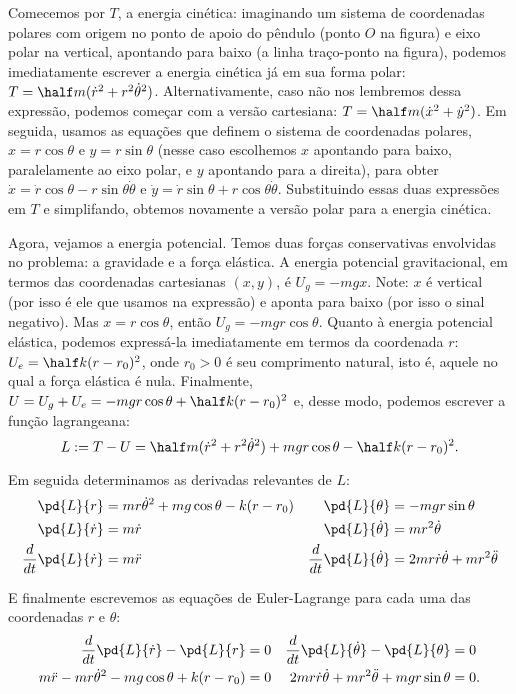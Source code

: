 \begin{question}
\begin{solution}
      Comecemos por $T$, a energia cinética: imaginando um sistema de coordenadas polares com origem no ponto de apoio do pêndulo (ponto $O$ na figura) e eixo polar na vertical, apontando para baixo (a linha traço-ponto na figura), podemos imediatamente escrever a energia cinética já em sua forma polar: $T = \half m (\dot r^2 + r^2 \dot \theta^2)$.
      Alternativamente, caso não nos lembremos dessa expressão, podemos começar com a versão cartesiana: $T = \half m (\dot x^2 + \dot y^2)$.
      Em seguida, usamos as equações que definem o sistema de coordenadas polares, $x = r \cos \theta$ e $y = r\sin \theta$ (nesse caso escolhemos $x$ apontando para baixo, paralelamente ao eixo polar, e $y$ apontando para a direita), para obter $\dot x = \dot r \cos \theta - r \sin \theta \dot \theta$ e $\dot y = \dot r \sin \theta + r \cos\theta \dot \theta$.
      Substituindo essas duas expressões em $T$ e simplifando, obtemos novamente a versão polar para a energia cinética.

      Agora, vejamos a energia potencial. Temos duas forças conservativas envolvidas no problema: a gravidade e a força elástica.
      A energia potencial gravitacional, em termos das coordenadas cartesianas $(x,y)$, é $U_g = -mgx$.
      Note: $x$ é vertical (por isso é ele que usamos na expressão) e aponta para baixo (por isso o sinal negativo).
      Mas $x = r\cos \theta$, então $U_g = -mgr\cos \theta$.
      Quanto à energia potencial elástica, podemos expressá-la imediatamente em termos da coordenada $r$: $U_e = \half k (r - r_0)^2$, onde $r_0 > 0$ é seu comprimento natural, isto é, aquele no qual a força elástica é nula.
      Finalmente, $U = U_g + U_e = -mgr\cos \theta + \half k (r - r_0)^2$ e, desse modo, podemos escrever a função lagrangeana:
      \begin{equation*}
        L := T - U = \half m (\dot r^2 + r^2 \dot \theta^2) + mgr\cos \theta - \half k (r - r_0)^2.
      \end{equation*}

      Em seguida determinamos as derivadas relevantes de $L$:
      \begin{align*}
        \pd{L}{r} &= mr\dot \theta^2 + mg\cos \theta - k(r - r_0)
          & \pd{L}{\theta} &= -mgr\sin\theta \\
        \pd{L}{\dot r} &= m\dot r
          & \pd{L}{\dot \theta} &= mr^2\dot \theta \\
        \frac{d}{dt}\pd{L}{\dot r} &= m\ddot r
          & \frac{d}{dt}\pd{L}{\dot \theta} &= 2mr\dot r\dot \theta + mr^2 \ddot \theta
      \end{align*}

      E finalmente escrevemos as equações de Euler-Lagrange para cada uma das coordenadas $r$ e $\theta$:
      \begin{align*}
        \frac{d}{dt}\pd{L}{\dot r} - \pd{L}{r} &= 0
          & \frac{d}{dt}\pd{L}{\dot \theta} - \pd{L}{\theta} &= 0 \\
        m\ddot r - mr\dot \theta^2 - mg\cos \theta + k(r - r_0) &= 0
          & 2mr\dot r\dot \theta + mr^2 \ddot \theta + mgr\sin\theta &= 0.
      \end{align*}
    \end{solution}
\end{question}